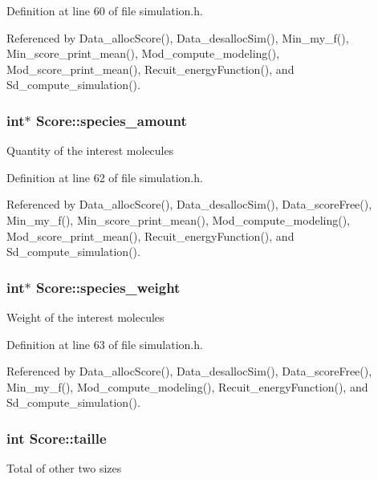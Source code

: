 Definition at line 60 of file simulation.h.



Referenced by Data\_\-allocScore(), Data\_\-desallocSim(), Min\_\-my\_\-f(), Min\_\-score\_\-print\_\-mean(), Mod\_\-compute\_\-modeling(), Mod\_\-score\_\-print\_\-mean(), Recuit\_\-energyFunction(), and Sd\_\-compute\_\-simulation().

\hypertarget{structScore_abb78b9e380ec83ab8f0274480c420be7}{
\subsubsection[{species\_\-amount}]{\setlength{\rightskip}{0pt plus 5cm}int$\ast$ {\bf Score::species\_\-amount}}}
\label{structScore_abb78b9e380ec83ab8f0274480c420be7}
Quantity of the interest molecules 

Definition at line 62 of file simulation.h.



Referenced by Data\_\-allocScore(), Data\_\-desallocSim(), Data\_\-scoreFree(), Min\_\-my\_\-f(), Min\_\-score\_\-print\_\-mean(), Mod\_\-compute\_\-modeling(), Mod\_\-score\_\-print\_\-mean(), Recuit\_\-energyFunction(), and Sd\_\-compute\_\-simulation().

\hypertarget{structScore_a46e74b92b29101ec9dc68255ab71a480}{
\subsubsection[{species\_\-weight}]{\setlength{\rightskip}{0pt plus 5cm}int$\ast$ {\bf Score::species\_\-weight}}}
\label{structScore_a46e74b92b29101ec9dc68255ab71a480}
Weight of the interest molecules 

Definition at line 63 of file simulation.h.



Referenced by Data\_\-allocScore(), Data\_\-desallocSim(), Data\_\-scoreFree(), Min\_\-my\_\-f(), Mod\_\-compute\_\-modeling(), Recuit\_\-energyFunction(), and Sd\_\-compute\_\-simulation().

\hypertarget{structScore_aee1e19fc90d330de6fced582dff7102c}{
\subsubsection[{taille}]{\setlength{\rightskip}{0pt plus 5cm}int {\bf Score::taille}}}
\label{structScore_aee1e19fc90d330de6fced582dff7102c}
Total of other two sizes 

